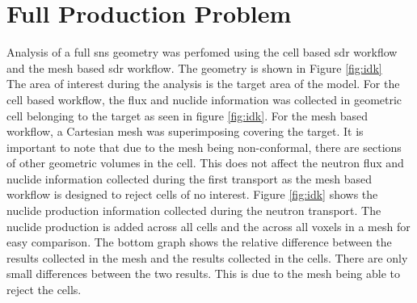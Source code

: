 \section{Full Production Problem}
Analysis of a full \gls{sns} geometry was perfomed using the cell
based \gls{sdr} workflow and the mesh based \gls{sdr} workflow.
The geometry is shown in Figure \ref{fig:idk}\\
The area of interest during the analysis is the target area of the model.
For the cell based workflow, the flux and nuclide information was collected
in geometric cell belonging to the target as seen in figure \ref{fig:idk}.
For the mesh based workflow, a Cartesian mesh was superimposing covering the
target. It is important to note that due to the mesh being non-conformal, there
are sections of other geometric volumes in the cell. This does not affect the
neutron flux and nuclide information collected during the first transport as
the mesh based workflow is designed to reject cells of no interest.
Figure \ref{fig:idk} shows the nuclide production information collected during
the neutron transport. The nuclide production is added across all cells and the
across all voxels in a mesh for easy comparison. The bottom graph shows the
relative difference between the results collected in the mesh and the results
collected in the cells. There are only small differences  between the two
results. This is due to the mesh being able to reject the cells.
\newpage
